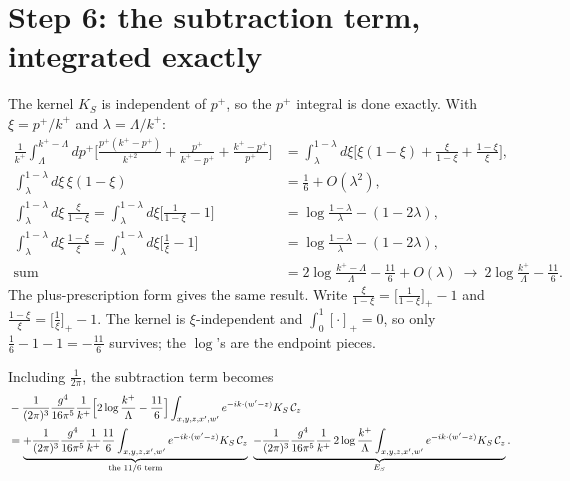 \documentclass[10pt]{article}
\numberwithin{equation}{section}
\begin{document}
\section{Step 6: the subtraction term, integrated exactly}
The kernel $K_{S}$ is independent of $p^{+}$, so the $p^{+}$ integral is done exactly. With $\xi=p^{+}/k^{+}$ and $\lambda=\Lambda/k^{+}$:
\begin{align}
\frac{1}{k^{+}}\int_{\Lambda}^{k^{+}-\Lambda}dp^{+}\Big[\tfrac{p^{+}(k^{+}-p^{+})}{k^{+2}}+\tfrac{p^{+}}{k^{+}-p^{+}}+\tfrac{k^{+}-p^{+}}{p^{+}}\Big]
&=\int_{\lambda}^{1-\lambda}d\xi\Big[\xi(1-\xi)+\frac{\xi}{1-\xi}+\frac{1-\xi}{\xi}\Big],\\
\int_{\lambda}^{1-\lambda}d\xi\,\xi(1-\xi)&=\frac{1}{6}+O(\lambda^{2}),\\
\int_{\lambda}^{1-\lambda}d\xi\,\frac{\xi}{1-\xi}=\int_{\lambda}^{1-\lambda}d\xi\Big[\frac{1}{1-\xi}-1\Big]&=\log\frac{1-\lambda}{\lambda}-(1-2\lambda),\\
\int_{\lambda}^{1-\lambda}d\xi\,\frac{1-\xi}{\xi}=\int_{\lambda}^{1-\lambda}d\xi\Big[\frac{1}{\xi}-1\Big]&=\log\frac{1-\lambda}{\lambda}-(1-2\lambda),\\
\text{sum}&=2\log\frac{k^{+}-\Lambda}{\Lambda}-\frac{11}{6}+O(\lambda)\ \to\ 2\log\frac{k^{+}}{\Lambda}-\frac{11}{6}.
\end{align}
The plus-prescription form gives the same result. Write $\frac{\xi}{1-\xi}=\big[\frac{1}{1-\xi}\big]_{+}-1$ and $\frac{1-\xi}{\xi}=\big[\frac{1}{\xi}\big]_{+}-1$. The kernel is $\xi$-independent and $\int_{0}^{1}[\cdot]_{+}=0$, so only $\frac{1}{6}-1-1=-\frac{11}{6}$ survives; the $\log$'s are the endpoint pieces.

Including $\frac{1}{2\pi}$, the subtraction term becomes
\begin{align}
&-\frac{1}{(2\pi)^{3}}\frac{g^{4}}{16\pi^{5}}\frac{1}{k^{+}}\Big[2\log\frac{k^{+}}{\Lambda}-\frac{11}{6}\Big]\int_{x,y,z,x',w'}e^{-ik\cdot(w'-z)}K_{S}\,\mathcal{C}_{z}\notag\\
&=\underbrace{+\frac{1}{(2\pi)^{3}}\frac{g^{4}}{16\pi^{5}}\frac{1}{k^{+}}\frac{11}{6}\int_{x,y,z,x',w'}e^{-ik\cdot(w'-z)}K_{S}\,\mathcal{C}_{z}}_{\text{the }11/6\text{ term}}
\ \underbrace{-\frac{1}{(2\pi)^{3}}\frac{g^{4}}{16\pi^{5}}\frac{1}{k^{+}}\,2\log\frac{k^{+}}{\Lambda}\int_{x,y,z,x',w'}e^{-ik\cdot(w'-z)}K_{S}\,\mathcal{C}_{z}}_{E_{S}}.
\end{align}
\end{document}
